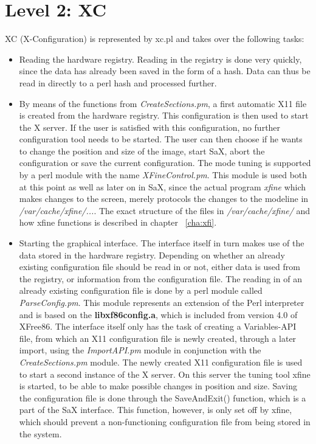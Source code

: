 \section{Level 2: XC}
\label{sec:le2}
XC (X-Configuration) is represented by xc.pl and 
takes over the following tasks:
\begin{itemize}
\item Reading the hardware registry. Reading in the registry is done very
  quickly, since the data has already been saved in the form of a hash. Data
  can thus be read in directly to a perl hash and processed further. 
\item By means of the functions from \textit{CreateSections.pm}, 
      a first automatic X11 file is created from the hardware registry. This
      configuration is then used to start the X server. If the user is
      satisfied with this configuration, no further configuration tool needs
      to be started. The user can then choose if he wants to change the
      position and size of the image, start SaX, abort the configuration or
      save the current configuration.  The mode tuning is supported by a perl
      module with the name \textit{XFineControl.pm}. This module is used both
      at this point as well as later on in SaX, since the actual program
      \textit{xfine} which makes changes to the screen, merely protocols the
      changes to the modeline in \textit{/var/cache/xfine/...}.
      The exact structure of the files in \textit{/var/cache/xfine/} and
      how xfine functions is described in chapter ~\ref{cha:xfi}.
\item Starting the graphical interface. The interface itself in turn makes use
  of the data stored in the hardware registry.
      Depending on whether an already existing configuration file should be
      read in or not, either data is used from the registry, or information
      from the configuration file. The reading in of an already existing
      configuration file is done by a perl module called
      \textit{ParseConfig.pm}. This module represents an extension of the 
      Perl interpreter and is based on the \textbf{libxf86config.a}, which is
      included from version 4.0 of XFree86. The interface itself only has the
      task of creating a Variables-API file, from which an X11 configuration
      file is newly created, through a later import, using the
      \textit{ImportAPI.pm} module in conjunction with the
      \textit{CreateSections.pm} module. The newly created X11 configuration
      file is used to start a second instance of the X server. On this server
      the tuning tool xfine is started, to be able to make possible changes in
      position and size. Saving the configuration file is done through the
      SaveAndExit() function, which is a part of the SaX interface. This
      function, however, is only set off by xfine, which should prevent a
      non-functioning configuration file from being stored in the system. 
\end{itemize}

